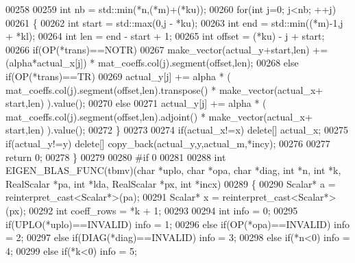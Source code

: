 \begin{DoxyCode}
00258 
00259   \textcolor{keywordtype}{int} nb = std::min(*n,(*m)+(*ku));
00260   \textcolor{keywordflow}{for}(\textcolor{keywordtype}{int} j=0; j<nb; ++j)
00261   \{
00262     \textcolor{keywordtype}{int} start = std::max(0,j - *ku);
00263     \textcolor{keywordtype}{int} end = std::min((*m)-1,j + *kl);
00264     \textcolor{keywordtype}{int} len = end - start + 1;
00265     \textcolor{keywordtype}{int} offset = (*ku) - j + start;
00266     \textcolor{keywordflow}{if}(OP(*trans)==NOTR)
00267       make\_vector(actual\_y+start,len) += (alpha*actual\_x[j]) * mat\_coeffs.col(j).segment(offset,len);
00268     \textcolor{keywordflow}{else} \textcolor{keywordflow}{if}(OP(*trans)==TR)
00269       actual\_y[j] += alpha * ( mat\_coeffs.col(j).segment(offset,len).transpose() * make\_vector(actual\_x+
      start,len) ).value();
00270     \textcolor{keywordflow}{else}
00271       actual\_y[j] += alpha * ( mat\_coeffs.col(j).segment(offset,len).adjoint()   * make\_vector(actual\_x+
      start,len) ).value();
00272   \}
00273 
00274   \textcolor{keywordflow}{if}(actual\_x!=x) \textcolor{keyword}{delete}[] actual\_x;
00275   \textcolor{keywordflow}{if}(actual\_y!=y) \textcolor{keyword}{delete}[] copy\_back(actual\_y,y,actual\_m,*incy);
00276 
00277   \textcolor{keywordflow}{return} 0;
00278 \}
00279 
00280 \textcolor{preprocessor}{#if 0}
00281 
00288 \textcolor{keywordtype}{int} EIGEN\_BLAS\_FUNC(tbmv)(\textcolor{keywordtype}{char} *uplo, \textcolor{keywordtype}{char} *opa, \textcolor{keywordtype}{char} *diag, \textcolor{keywordtype}{int} *n, \textcolor{keywordtype}{int} *k, RealScalar *pa, \textcolor{keywordtype}{int} *lda, 
      RealScalar *px, \textcolor{keywordtype}{int} *incx)
00289 \{
00290   Scalar* a = \textcolor{keyword}{reinterpret\_cast<}Scalar*\textcolor{keyword}{>}(pa);
00291   Scalar* x = \textcolor{keyword}{reinterpret\_cast<}Scalar*\textcolor{keyword}{>}(px);
00292   \textcolor{keywordtype}{int} coeff\_rows = *k + 1;
00293 
00294   \textcolor{keywordtype}{int} info = 0;
00295        \textcolor{keywordflow}{if}(UPLO(*uplo)==INVALID)                                       info = 1;
00296   \textcolor{keywordflow}{else} \textcolor{keywordflow}{if}(OP(*opa)==INVALID)                                          info = 2;
00297   \textcolor{keywordflow}{else} \textcolor{keywordflow}{if}(DIAG(*diag)==INVALID)                                       info = 3;
00298   \textcolor{keywordflow}{else} \textcolor{keywordflow}{if}(*n<0)                                                       info = 4;
00299   \textcolor{keywordflow}{else} \textcolor{keywordflow}{if}(*k<0)                                                       info = 5;

\end{DoxyCode}
